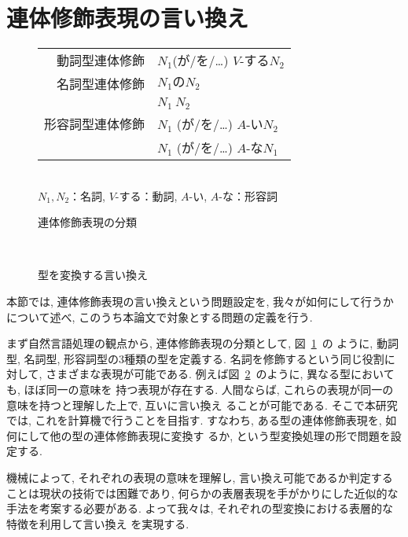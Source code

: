 \section{連体修飾表現の言い換え}\label{taishou}
\begin{figure}[hbt]
\begin{center}
\begin{tabular}{rl}
\hline
動詞型連体修飾 & $N_1$(が/を/…) $V$-する$N_2$\\
名詞型連体修飾 & $N_1のN_2$ \\
 & $N_1\ N_2$  \\
形容詞型連体修飾 &  $N_1$ (が/を/…) $A$-い$N_2$ \\
 & $N_1$ (が/を/…) $A$-な$N_1$ \\
\hline
\end{tabular}\\
\vspace{0.5mm}
$N_1, N_2$：名詞, $V$-する：動詞, $A$-い, $A$-な：形容詞\\
\caption{連体修飾表現の分類}
\label{bunrui}
\end{center}
\end{figure}

\begin{figure}[hbt]
\begin{center}
\\
\caption{型を変換する言い換え}
\label{katahenkan}
\end{center}
\end{figure}

本節では, 連体修飾表現の言い換えという問題設定を, 我々が如何にして行うか
について述べ, このうち本論文で対象とする問題の定義を行う.

まず自然言語処理の観点から, 連体修飾表現の分類として, 図~\ref{bunrui}~の
ように, 動詞型, 名詞型, 形容詞型の3種類の型を定義する. 
名詞を修飾するという同じ役割に対して, さまざまな表現が可能である.
例えば図~\ref{katahenkan}~のように, 異なる型においても, ほぼ同一の意味を
持つ表現が存在する.
人間ならば, これらの表現が同一の意味を持つと理解した上で, 互いに言い換え
ることが可能である.
そこで本研究では, これを計算機で行うことを目指す.
すなわち, ある型の連体修飾表現を, 如何にして他の型の連体修飾表現に変換す
るか, という型変換処理の形で問題を設定する.

機械によって, それぞれの表現の意味を理解し, 言い換え可能であるか判定する
ことは現状の技術では困難であり,
何らかの表層表現を手がかりにした近似的な手法を考案する必要がある.
よって我々は, それぞれの型変換における表層的な特徴を利用して言い換え
を実現する.

